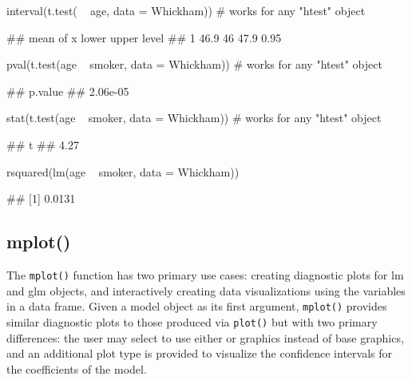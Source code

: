 \begin{Schunk}
\begin{Sinput}
interval(t.test( ~ age, data = Whickham))      # works for any "htest" object
\end{Sinput}
\begin{Soutput}
##   mean of x lower upper level
## 1      46.9    46  47.9  0.95
\end{Soutput}
\begin{Sinput}
pval(t.test(age ~ smoker, data = Whickham))    # works for any "htest" object
\end{Sinput}
\begin{Soutput}
##  p.value 
## 2.06e-05
\end{Soutput}
\begin{Sinput}
stat(t.test(age ~ smoker, data = Whickham))    # works for any "htest" object
\end{Sinput}
\begin{Soutput}
##    t 
## 4.27
\end{Soutput}
\begin{Sinput}
rsquared(lm(age ~ smoker, data = Whickham))
\end{Sinput}
\begin{Soutput}
## [1] 0.0131
\end{Soutput}
\end{Schunk}

\subsection{mplot()}\label{mplot}

The \texttt{mplot()} function has two primary use cases: creating
diagnostic plots for lm and glm objects, and interactively creating data
visualizations using the variables in a data frame. Given a model object
as its first argument, \texttt{mplot()} provides similar diagnostic
plots to those produced via \texttt{plot()} but with two primary
differences: the user may select to use either  or
 \citep{ggplot2} graphics instead of base graphics, and
an additional plot type is provided to visualize the confidence
intervals for the coefficients of the model.

